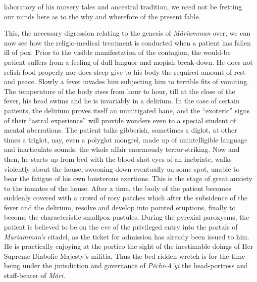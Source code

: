 \documentclass[a4paper, 12pt, oneside, english, twocolumn]{article}
\begin{document}
laboratory of his nursery tales and ancestral tradition, we need not be fretting our minds here as to the why and wherefore of the present fable.

This, the necessary digression relating to the genesis of \emph{Mâriamman} over, we can now see how the religio-medical treatment is conducted when a patient has fallen ill of pox. Prior to the visible manifestation of the contagion, the would-be patient suffers from a feeling of dull languor and mopish break-down. He does not relish food properly nor does sleep give to his body the required amount of rest and peace. Slowly a fever invades him subjecting him to terrible fits of vomiting. The temperature of the body rises from hour to hour, till at the close of the fever, his head swims and he is invariably in a delirium. In the case of certain patients, the delirium proves itself an unmitigated bane, and the ``exoteric'' signs of their ``astral experience'' will provide wonders even to a special student of mental aberrations. The patient talks gibberish, sometimes a diglot, at other times a triglot, nay, even a polyglot mongrel, made up of unintelligible language and inarticulate sounds, the whole affair enormously terror-striking. Now and then, he starts up from bed with the blood-shot eyes of an inebriate, walks violently about the house, swooning down eventually on some spot, unable to bear the fatigue of his own boisterous exertions. This is the stage of great anxiety to the inmates of the house. After a time, the body of the patient becomes suddenly covered with a crowd of rosy patches which after the subsidence of the fever and the delirium, resolve and develop into pointed eruptions, finally to become the characteristic smallpox pustules. During the pyrexial paroxysms, the patient is believed to be on the eve of the privileged entry into the portals of \emph{Mariamman's} citadel, as the ticket for admission has already been issued to him. He is practically enjoying at the portico the sight of the inestimable doings of Her Supreme Diabolic Majesty's militia. Thus the bed-ridden wretch is for the time being under the jurisdiction and governance of \emph{Pêchi-A'yi} the head-portress and staff-bearer of \emph{Mâri}.
\end{document}
